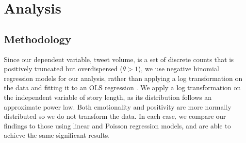 \documentclass[letterpaper]{article}
\begin{document}
\section{Analysis}  
\subsection{Methodology}
Since our dependent variable, tweet volume, is a set of discrete counts that is positively truncated but overdispersed ($\theta > 1$), we use negative binomial regression models for our analysis, rather than applying a log transformation on the data and fitting it to an OLS regression \cite{scott1997regression, o2010not}. We apply a log transformation on the independent variable of story length, as its distribution follows an approximate power law. Both emotionality and positivity are more normally distributed so we do not transform the data. In each case, we compare our findings to those using linear and Poisson regression models, and are able to achieve the same significant results. 
 
\end{document}
